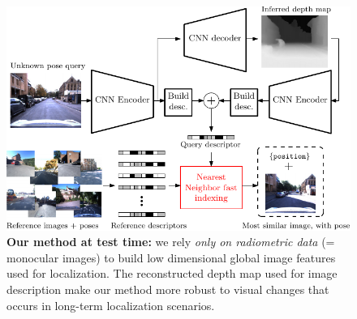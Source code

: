 \begin{figure}
	\center
	\includegraphics[width=\linewidth]{intro/visual_abstract}
	\caption{\label{fig:our_method_deployment} \textbf{Our method at test time:} we rely \textit{only on radiometric data} (= monocular images) to build low dimensional global image features used for localization. The reconstructed depth map used for image description make our method more robust to visual changes that occurs in long-term localization scenarios.}
\end{figure}